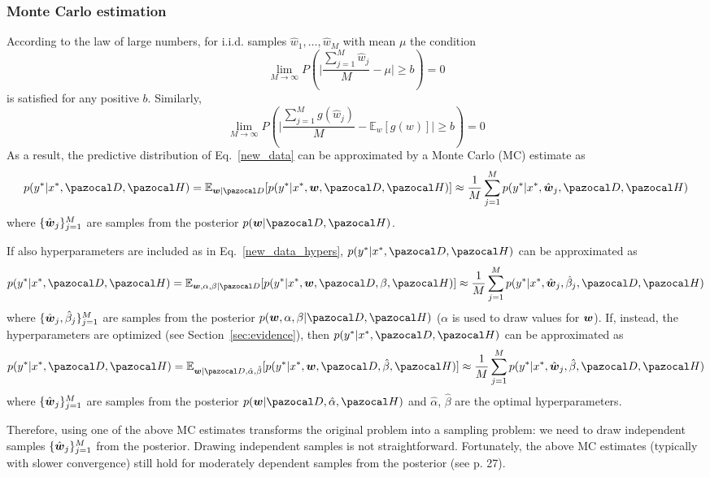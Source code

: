 \subsubsection{Monte Carlo estimation}\label{sec:mc} 
According to the law of large numbers, for i.i.d. samples $\hat{w}_1,\dots,\hat{w}_M$ with mean $\mu$ the condition 
\begin{equation}
	\lim\limits_{M\to \infty} P\left(\bigg|\frac{\sum_{j=1}^M\hat{w}_j}{M}-\mu\bigg|\geq b \right) = 0
\end{equation}
is satisfied for any positive $b$.
Similarly, 
\begin{equation}
\lim\limits_{M\to \infty} P\left(\bigg|\frac{\sum_{j=1}^Mg(\hat{w}_j)}{M}-\mathbb{E}_w[g(w)]\bigg|\geq b \right) = 0
\end{equation}
As a result, the predictive distribution of Eq.~\eqref{new_data} can be approximated by a Monte Carlo (MC) estimate as
\begin{equation}\label{new_data_mc}
p(y^*|x^*, \cD, \cH) = \mathbb{E}_{\bw|\cD}[p(y^*|x^*, \bw,\cD, \cH)] \approx \frac{1}{M}\sum_{j=1}^Mp(y^*|x^*, \hat{\bw}_j,\cD, \cH)
\end{equation}
where $\{\hat{\boldsymbol{w}}_j\}_{j=1}^M$ are samples from the posterior $p(\bw|\cD,\cH)$.

If also hyperparameters are included as in Eq.~\eqref{new_data_hypers}, $p(y^*|x^*, \cD, \cH)$ can be approximated as 
\begin{equation}\label{new_data_mc_2}
p(y^*|x^*, \cD, \cH) = \mathbb{E}_{\bw,\alpha,\beta|\cD}[p(y^*|x^*, \bw,\cD, \beta,\cH)] \approx \frac{1}{M}\sum_{j=1}^Mp(y^*|x^*, \hat{\bw}_j,\hat{\beta}_j,\cD, \cH)
\end{equation}
where  $\{\hat{\boldsymbol{w}}_j,\hat{\beta}_j\}_{j=1}^M$ are samples from the posterior $p(\bw,\alpha,\beta|\cD,\cH)$ ($\alpha$ is used to draw values for $\boldsymbol{w}$).
If, instead, the hyperparameters are optimized (see Section~\ref{sec:evidence}), then 
$p(y^*|x^*, \cD, \cH)$ can be approximated as 
\begin{equation}\label{new_data_mc_3}
p(y^*|x^*, \cD, \cH) = \mathbb{E}_{\bw|\cD,\hat{\alpha},\hat{\beta}}[p(y^*|x^*, \bw,\cD, \hat{\beta},\cH)] \approx \frac{1}{M}\sum_{j=1}^Mp(y^*|x^*, \hat{\bw}_j,\hat{\beta},\cD, \cH)
\end{equation}
where $\{\hat{\boldsymbol{w}}_j\}_{j=1}^M$ are samples from the posterior $p(\bw|\cD,\hat{\alpha},\cH)$ and $\hat{\alpha}$, $\hat{\beta}$ are the optimal hyperparameters.

Therefore, using one of the above MC estimates transforms the original problem into a sampling problem: we need to draw independent samples $\{\hat{\boldsymbol{w}}_j\}_{j=1}^M$ from the posterior. 
Drawing independent samples is not straightforward. 
Fortunately, the above MC estimates (typically with slower convergence) still hold for moderately dependent samples from the posterior (see \cite{neal1995bayesian} p. 27).

